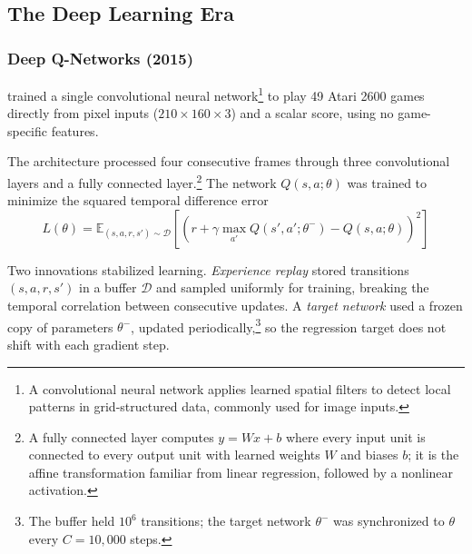 \subsection{The Deep Learning Era}

\subsubsection{Deep Q-Networks (2015)}

\citet{mnih2015} trained a single convolutional neural network\footnote{A convolutional neural network applies learned spatial filters to detect local patterns in grid-structured data, commonly used for image inputs.} to play 49 Atari 2600 games directly from pixel inputs ($210 \times 160 \times 3$) and a scalar score, using no game-specific features.

The architecture processed four consecutive frames through three convolutional layers and a fully connected layer.\footnote{A fully connected layer computes $y = Wx + b$ where every input unit is connected to every output unit with learned weights $W$ and biases $b$; it is the affine transformation familiar from linear regression, followed by a nonlinear activation.} The network $Q(s, a; \theta)$ was trained to minimize the squared temporal difference error
\begin{equation}
L(\theta) = \mathbb{E}_{(s,a,r,s') \sim \mathcal{D}} \left[ \left( r + \gamma \max_{a'} Q(s', a'; \theta^-) - Q(s, a; \theta) \right)^2 \right]
\end{equation}

Two innovations stabilized learning. \textit{Experience replay} \citep{Lin1992} stored transitions $(s, a, r, s')$ in a buffer $\mathcal{D}$ and sampled uniformly for training, breaking the temporal correlation between consecutive updates. A \textit{target network} used a frozen copy of parameters $\theta^-$, updated periodically,\footnote{The buffer held $10^6$ transitions; the target network $\theta^-$ was synchronized to $\theta$ every $C = 10{,}000$ steps.} so the regression target does not shift with each gradient step.


